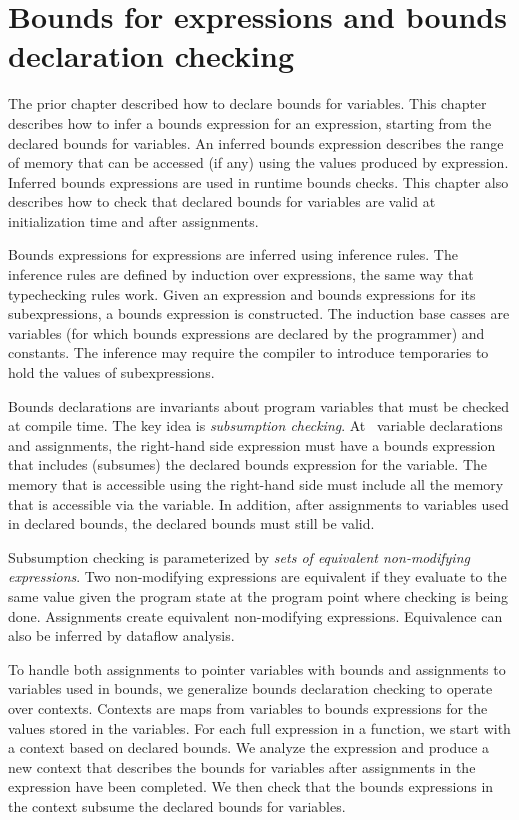 
\chapter{Bounds for expressions and bounds declaration checking}
\label{chapter:checking-bounds}

The prior chapter described how to declare bounds for variables.
This chapter describes how to infer a bounds expression for 
an expression, starting from the declared bounds for variables.
An inferred bounds expression
describes the range of memory that can be accessed (if any) using 
the values produced by expression.  Inferred bounds expressions
are used in runtime bounds checks.   This chapter also describes how to
 check that declared bounds for variables are valid at initialization
 time and after assignments.

Bounds expressions for expressions are inferred using inference
rules.  The inference rules are defined by induction over expressions, 
the same way that typechecking rules work.  Given an expression
and bounds expressions for its subexpressions, a bounds expression
is constructed.  The induction base casses are variables (for which
bounds expressions are declared by the programmer) and constants.
The inference may require the compiler to introduce temporaries to
hold the values of subexpressions.

Bounds declarations are invariants about program variables
that must be checked at compile time.  The key idea is {\em subsumption checking}.
At \arrayptr\ variable declarations and assignments, 
the right-hand side expression must have a bounds expression that includes (subsumes) 
the declared bounds  expression for the variable.  The memory that is accessible using
the right-hand side must include all the memory that is accessible via the variable.
In addition, after assignments to variables used in declared bounds, the
declared bounds must still be valid.

Subsumption checking is parameterized by {\it sets of equivalent non-modifying expressions}.
Two non-modifying expressions are equivalent if they
evaluate to the same value given the program state at the program point where 
checking is being done.  Assignments create equivalent non-modifying
expressions. Equivalence can also be inferred by dataflow analysis.

To handle both assignments to pointer variables with bounds and assignments
to variables used in bounds, we generalize bounds declaration
checking to operate over contexts.  Contexts are maps from variables
to bounds expressions for the values stored in the variables.  For
each full expression in a function, we start with a context based
on declared bounds.  We analyze the expression and produce a new
context that describes the bounds for variables after assignments
in the expression have been completed.  We then check that the bounds
expressions in the context subsume the declared bounds for variables.

